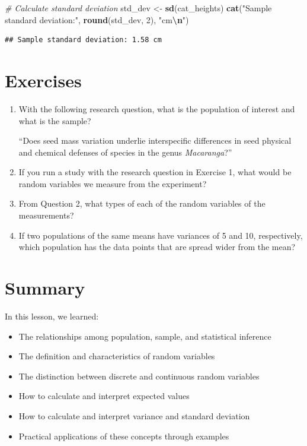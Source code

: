\documentclass[
]{book}
\newenvironment{Shaded}{\begin{snugshade}}{\end{snugshade}}
\newcommand{\CommentTok}[1]{\textcolor[rgb]{0.56,0.35,0.01}{\textit{#1}}}
\newcommand{\DecValTok}[1]{\textcolor[rgb]{0.00,0.00,0.81}{#1}}
\newcommand{\FunctionTok}[1]{\textcolor[rgb]{0.13,0.29,0.53}{\textbf{#1}}}
\newcommand{\NormalTok}[1]{#1}
\newcommand{\OtherTok}[1]{\textcolor[rgb]{0.56,0.35,0.01}{#1}}
\newcommand{\SpecialCharTok}[1]{\textcolor[rgb]{0.81,0.36,0.00}{\textbf{#1}}}
\newcommand{\StringTok}[1]{\textcolor[rgb]{0.31,0.60,0.02}{#1}}
\providecommand{\tightlist}{%
  \setlength{\itemsep}{0pt}\setlength{\parskip}{0pt}}
\begin{document}
\begin{Shaded}
\begin{Highlighting}[]
\CommentTok{\# Calculate standard deviation}
\NormalTok{std\_dev }\OtherTok{\textless{}{-}} \FunctionTok{sd}\NormalTok{(cat\_heights)}
\FunctionTok{cat}\NormalTok{(}\StringTok{"Sample standard deviation:"}\NormalTok{, }\FunctionTok{round}\NormalTok{(std\_dev, }\DecValTok{2}\NormalTok{), }\StringTok{"cm}\SpecialCharTok{\textbackslash{}n}\StringTok{"}\NormalTok{)}
\end{Highlighting}
\end{Shaded}

\begin{verbatim}
## Sample standard deviation: 1.58 cm
\end{verbatim}

\section{Exercises}\label{exercises-2}

\begin{enumerate}
\def\labelenumi{\arabic{enumi}.}
\item
  With the following research question, what is the population of interest and what is the sample?

  ``Does seed mass variation underlie interspecific differences in seed physical and chemical defenses of species in the genus \emph{Macaranga}?''
\item
  If you run a study with the research question in Exercise 1, what would be random variables we measure from the experiment?
\item
  From Question 2, what types of each of the random variables of the measurements?
\item
  If two populations of the same means have variances of 5 and 10, respectively, which population has the data points that are spread wider from the mean?
\end{enumerate}

\section{Summary}\label{summary}

In this lesson, we learned:

\begin{itemize}
\tightlist
\item
  The relationships among population, sample, and statistical inference
\item
  The definition and characteristics of random variables
\item
  The distinction between discrete and continuous random variables
\item
  How to calculate and interpret expected values
\item
  How to calculate and interpret variance and standard deviation
\item
  Practical applications of these concepts through examples
\end{itemize}
\end{document}
